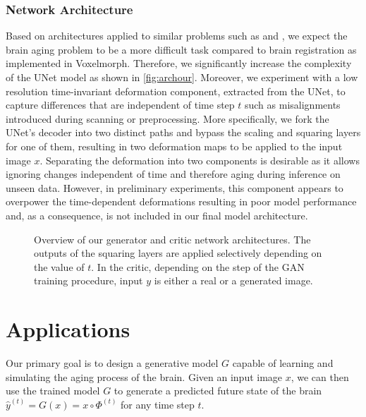 \subsection{Network Architecture}
Based on architectures applied to similar problems such as \cite{wegmayr2019generative} and \cite{baumgartner2018visual}, we expect the brain aging problem to be a more difficult task compared to brain registration as implemented in Voxelmorph. Therefore, we significantly increase the complexity of the UNet model as shown in \autoref{fig:archour}.
Moreover, we experiment with a low resolution time-invariant deformation component, extracted from the UNet, to capture differences that are independent of time step $t$ such as misalignments introduced during scanning or preprocessing. More specifically, we fork the UNet's decoder into two distinct paths and bypass the scaling and squaring layers for one of them, resulting in two deformation maps to be applied to the input image $x$. Separating the deformation into two components is desirable as it allows ignoring changes independent of time and therefore aging during inference on unseen data.
However, in preliminary experiments, this component appears to overpower the time-dependent deformations resulting in poor model performance and, as a consequence, is not included in our final model architecture.

\begin{figure}
	\centering
	
	\caption{Overview of our generator and critic network architectures. The outputs of the squaring layers are applied selectively depending on the value of $t$. In the critic, depending on the step of the GAN training procedure, input $y$ is either a real or a generated image.}
	\label{fig:archour}
\end{figure}

\chapter{Applications}
Our primary goal is to design a generative model $G$ capable of learning and simulating the aging process of the brain. Given an input image $x$, we can then use the trained model $G$ to generate a predicted future state of the brain $\hat y^{(t)} = G(x) = x \circ \Phi^{(t)}$ for any time step $t$.

